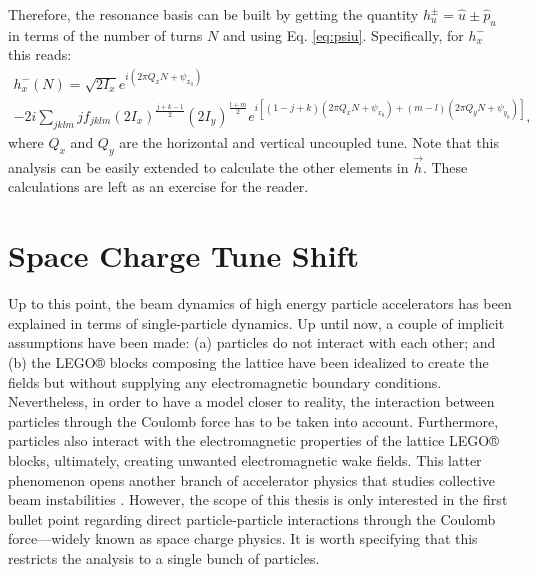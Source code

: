 Therefore, the resonance basis can be built by getting the quantity $h_u^{\pm}=\hat{u}\pm \hat{p}_u$ in terms of the number of turns $N$ and using Eq. \ref{eq:psiu}. Specifically, for $h_x^{-}$ this reads:
\begin{multline}
    \label{eq:hx-}
    h_x^{-}(N)=\sqrt{2I_x}e^{i\left( 2\pi Q_x N +\psi_{x_0}\right)} \\
    -2i \sum_{jklm} j f_{jklm} \left( 2I_x \right)^{\frac{j+k-1}{2}}\left( 2I_y \right)^{\frac{l+m}{2}}
    e^{i \left[ \left( 1-j+k\right)\left( 2\pi Q_x N + \psi_{x_0} \right) +\left( m-l\right)\left( 2\pi Q_y N + \psi_{y_0} \right)\right]},
\end{multline}
where $Q_x$ and $Q_y$ are the horizontal and vertical uncoupled tune. Note that this analysis can be easily extended to calculate the other elements in $\vec{h}$. These calculations are left as an exercise for the reader.  

\section{\label{sec:sc1}Space Charge Tune Shift}

Up to this point, the beam dynamics of high energy particle accelerators has been explained in terms of single-particle dynamics. Up until now, a couple of implicit assumptions have been made: (a) particles do not interact with each other; and (b) the LEGO® blocks composing the lattice have been idealized to create the fields but without supplying any electromagnetic boundary conditions. Nevertheless, in order to have a model closer to reality, the interaction between particles through the Coulomb force has to be taken into account. Furthermore, particles also interact with the electromagnetic properties of the lattice LEGO® blocks, ultimately, creating unwanted electromagnetic wake fields. This latter phenomenon opens another branch of accelerator physics that studies collective beam instabilities \cite{chao}. However, the scope of this thesis is only interested in the first bullet point regarding direct particle-particle interactions through the Coulomb force---widely known as space charge physics. It is worth specifying that this restricts the analysis to a single bunch of particles. 

